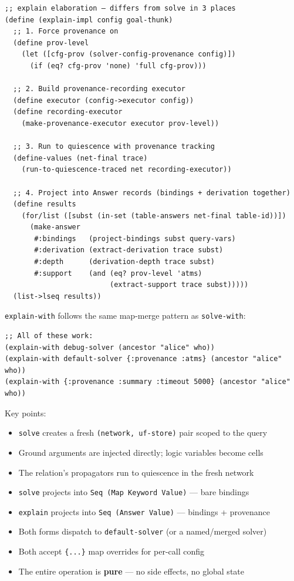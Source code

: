 \documentclass[11pt]{article}
\begin{document}
\begin{verbatim}
;; explain elaboration — differs from solve in 3 places
(define (explain-impl config goal-thunk)
  ;; 1. Force provenance on
  (define prov-level
    (let ([cfg-prov (solver-config-provenance config)])
      (if (eq? cfg-prov 'none) 'full cfg-prov)))

  ;; 2. Build provenance-recording executor
  (define executor (config->executor config))
  (define recording-executor
    (make-provenance-executor executor prov-level))

  ;; 3. Run to quiescence with provenance tracking
  (define-values (net-final trace)
    (run-to-quiescence-traced net recording-executor))

  ;; 4. Project into Answer records (bindings + derivation together)
  (define results
    (for/list ([subst (in-set (table-answers net-final table-id))])
      (make-answer
       #:bindings   (project-bindings subst query-vars)
       #:derivation (extract-derivation trace subst)
       #:depth      (derivation-depth trace subst)
       #:support    (and (eq? prov-level 'atms)
                         (extract-support trace subst)))))
  (list->lseq results))
\end{verbatim}

\texttt{explain-with} follows the same map-merge pattern as \texttt{solve-with}:

\begin{verbatim}
;; All of these work:
(explain-with debug-solver (ancestor "alice" who))
(explain-with default-solver {:provenance :atms} (ancestor "alice" who))
(explain-with {:provenance :summary :timeout 5000} (ancestor "alice" who))
\end{verbatim}

Key points:
\begin{itemize}
\item \texttt{solve} creates a fresh \texttt{(network, uf-store)} pair scoped to the query
\item Ground arguments are injected directly; logic variables become cells
\item The relation's propagators run to quiescence in the fresh network
\item \texttt{solve} projects into \texttt{Seq (Map Keyword Value)} — bare bindings
\item \texttt{explain} projects into \texttt{Seq (Answer Value)} — bindings + provenance
\item Both forms dispatch to \texttt{default-solver} (or a named/merged solver)
\item Both accept \texttt{\{...\}} map overrides for per-call config
\item The entire operation is \textbf{pure} — no side effects, no global state
\end{itemize}
\end{document}
